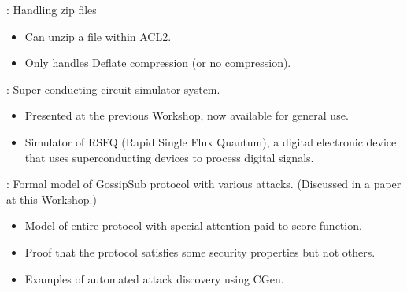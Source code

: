 
\begin{frame}

\newlibtitle

:
Handling zip files
\begin{itemize}
\item Can unzip a file within ACL2.
\item Only handles Deflate compression (or no compression).
\end{itemize}

\end{frame}


\begin{frame}

\newlibtitle

:
Super-conducting circuit simulator system.
\begin{itemize}
\item Presented at the previous Workshop, now available for general use.
\item Simulator of RSFQ (Rapid Single Flux Quantum),
      a digital electronic device that uses superconducting devices
      to process digital signals.
\end{itemize}

\end{frame}


\begin{frame}

\newlibtitle

:
Formal model of GossipSub protocol with various attacks.
(Discussed in a paper at this Workshop.)
\begin{itemize}
\item Model of entire protocol with special attention paid to score function.
\item Proof that the protocol satisfies some security properties but not others.
\item Examples of automated attack discovery using CGen.
\end{itemize}

\end{frame}

